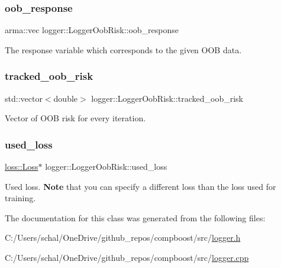 \subsubsection{\texorpdfstring{oob\+\_\+response}{oob\_response}}
{\footnotesize\ttfamily arma\+::vec logger\+::\+Logger\+Oob\+Risk\+::oob\+\_\+response\hspace{0.3cm}{\ttfamily [private]}}



The response variable which corresponds to the given O\+OB data. 

\mbox{\label{classlogger_1_1_logger_oob_risk_abdc2e187dc393056b2986882dbb5b03f}} 
\subsubsection{\texorpdfstring{tracked\+\_\+oob\+\_\+risk}{tracked\_oob\_risk}}
{\footnotesize\ttfamily std\+::vector$<$double$>$ logger\+::\+Logger\+Oob\+Risk\+::tracked\+\_\+oob\+\_\+risk\hspace{0.3cm}{\ttfamily [private]}}



Vector of O\+OB risk for every iteration. 

\mbox{\label{classlogger_1_1_logger_oob_risk_af889f26216d86721dcab4fb0823ac525}} 
\subsubsection{\texorpdfstring{used\+\_\+loss}{used\_loss}}
{\footnotesize\ttfamily \mbox{\hyperlink{classloss_1_1_loss}{loss\+::\+Loss}}$\ast$ logger\+::\+Logger\+Oob\+Risk\+::used\+\_\+loss\hspace{0.3cm}{\ttfamily [private]}}



Used loss. {\bfseries Note} that you can specify a different loss than the loss used for training. 



The documentation for this class was generated from the following files\+:\begin{DoxyCompactItemize}
\item 
C\+:/\+Users/schal/\+One\+Drive/github\+\_\+repos/compboost/src/\mbox{\hyperlink{logger_8h}{logger.\+h}}\item 
C\+:/\+Users/schal/\+One\+Drive/github\+\_\+repos/compboost/src/\mbox{\hyperlink{logger_8cpp}{logger.\+cpp}}\end{DoxyCompactItemize}
